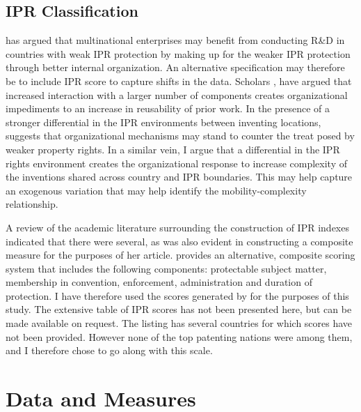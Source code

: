 \documentclass[12pt]{article}
\begin{document}
\subsection{IPR Classification}
\cite{Zhao2006} has argued  that multinational enterprises may benefit from conducting R\&D in countries with weak IPR protection by  making up for the weaker IPR protection through better internal organization. An alternative specification may therefore be to include IPR score to capture shifts in the data. Scholars \citep{Yayavaram2008, Baldwin2015}, have argued that increased interaction with a larger number of components creates organizational impediments to an increase in reusability of prior work. In the presence of a stronger differential in the IPR environments between inventing locations, \cite{Zhao2006} suggests that organizational mechanisms may stand to counter the treat posed by weaker property rights. In a similar vein, I argue that a differential in the IPR rights environment creates the organizational response to increase complexity of the inventions shared across country and IPR boundaries. This may help capture an exogenous variation that may help identify the mobility-complexity relationship.

A review of the academic literature surrounding the construction of IPR indexes indicated that there were several, as was also evident in \cite{Zhao2006} constructing a composite measure for the purposes of her article. \cite{Lesser2010} provides an alternative, composite scoring system that includes the following components: protectable subject matter, membership in convention, enforcement, administration and duration of protection. I have therefore used the scores generated by \cite{Lesser2010} for the purposes of this study. The extensive table of IPR scores has not been presented here, but can be made available on request. The listing has several countries for which scores have not been provided. However none of the top patenting nations were among them, and I therefore chose to go along with this scale.

\section{Data and Measures}
\end{document}
